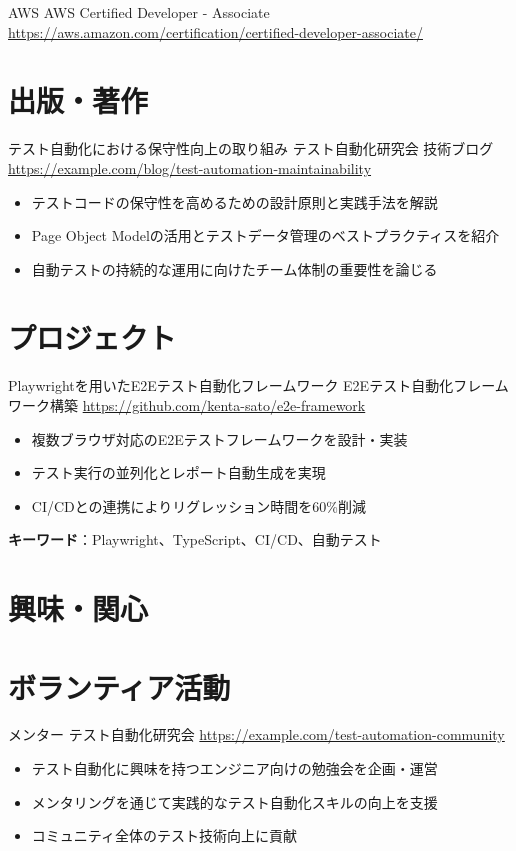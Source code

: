 \documentclass[a4paper, serif, 10pt]{moderncv}
\begin{document}
        {AWS}
        {AWS Certified Developer - Associate}
        {\url{https://aws.amazon.com/certification/certified-developer-associate/}}
        {}
        {}
\section{出版・著作}

        {テスト自動化における保守性向上の取り組み}
        {テスト自動化研究会 技術ブログ}
        {\url{https://example.com/blog/test-automation-maintainability}}
        {}
        {\begin{itemize}
\item テストコードの保守性を高めるための設計原則と実践手法を解説
\item Page Object Modelの活用とテストデータ管理のベストプラクティスを紹介
\item 自動テストの持続的な運用に向けたチーム体制の重要性を論じる
\end{itemize}}
\section{プロジェクト}

        {Playwrightを用いたE2Eテスト自動化フレームワーク}
        {E2Eテスト自動化フレームワーク構築}
        {\url{https://github.com/kenta-sato/e2e-framework}}
        {}
        {\begin{itemize}
\item 複数ブラウザ対応のE2Eテストフレームワークを設計・実装
\item テスト実行の並列化とレポート自動生成を実現
\item CI/CDとの連携によりリグレッション時間を60\%削減
\end{itemize}
\textbf{キーワード}：Playwright、TypeScript、CI/CD、自動テスト}
\section{興味・関心}

\section{ボランティア活動}

        {メンター}
        {テスト自動化研究会}
        {\url{https://example.com/test-automation-community}}
        {}
        {\begin{itemize}
\item テスト自動化に興味を持つエンジニア向けの勉強会を企画・運営
\item メンタリングを通じて実践的なテスト自動化スキルの向上を支援
\item コミュニティ全体のテスト技術向上に貢献
\end{itemize}}
    
\end{document}

